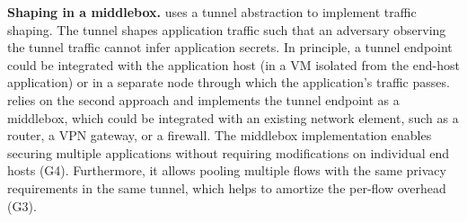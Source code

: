
%

\textbf{Shaping in a middlebox.}
{\sys} uses a tunnel abstraction to implement traffic shaping.
The tunnel shapes application traffic such that an
adversary observing the tunnel traffic cannot infer application secrets.
In principle, a tunnel endpoint could be integrated with the application host
(\eg in a VM isolated from the end-host application) or in a
separate node through which the application's traffic passes.
{\sys} relies on the second approach and implements the tunnel endpoint as a
middlebox, which could be integrated with an existing network element, such as a
router, a VPN gateway, or a firewall.
The middlebox implementation enables securing multiple applications without
requiring modifications on individual end hosts (G4).
Furthermore, it allows pooling multiple flows with the same privacy requirements
in the same tunnel, which helps to amortize the per-flow overhead (G3).

